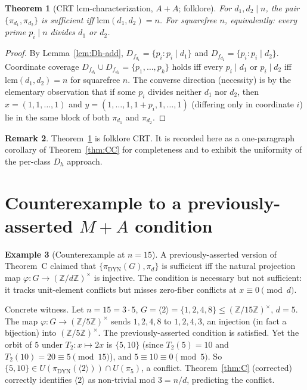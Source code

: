 \documentclass[11pt,reqno]{amsart}
\theoremstyle{plain}
\newtheorem{theorem}{Theorem}
\theoremstyle{definition}
\newtheorem{remark}[theorem]{Remark}
\newtheorem{example}[theorem]{Example}
\newcommand{\Z}{\mathbb{Z}}
\newcommand{\DYN}{\mathrm{DYN}}
\newcommand{\lcm}{\mathrm{lcm}}
\begin{document}
\begin{theorem}[CRT $\lcm$-characterization, $A{+}A$; folklore] \label{thm:D}
For $d_1, d_2 \mid n$, the pair $\{\pi_{d_1}, \pi_{d_2}\}$ is
sufficient iff $\lcm(d_1, d_2) = n$. For squarefree $n$,
equivalently: every prime $p_i \mid n$ divides $d_1$ or $d_2$.
\end{theorem}

\begin{proof}
By Lemma~\ref{lem:Dh-add}, $D_{f_{d_1}} = \{p_i : p_i \mid d_1\}$ and
$D_{f_{d_2}} = \{p_i : p_i \mid d_2\}$. Coordinate coverage
$D_{f_{d_1}} \cup D_{f_{d_2}} = \{p_1, \ldots, p_k\}$ holds iff every
$p_i \mid d_1$ or $p_i \mid d_2$ iff $\lcm(d_1, d_2) = n$ for
squarefree $n$. The converse direction (necessity) is by the
elementary observation that if some $p_i$ divides neither $d_1$ nor
$d_2$, then $x = (1, 1, \ldots, 1)$ and $y = (1, \ldots, 1, 1 + p_i, 1, \ldots, 1)$
(differing only in coordinate $i$) lie in the same block of both
$\pi_{d_1}$ and $\pi_{d_2}$.
\end{proof}

\begin{remark}
Theorem~\ref{thm:D} is folklore CRT. It is recorded here as a
one-paragraph corollary of Theorem~\ref{thm:CC} for completeness and
to exhibit the uniformity of the per-class $D_h$ approach.
\end{remark}

\section{Counterexample to a previously-asserted $M{+}A$ condition} \label{sec:n15}

\begin{example}[Counterexample at $n = 15$] \label{ex:n15}
A previously-asserted version of Theorem~C claimed that
$\{\pi_{\DYN}(G), \pi_d\}$ is sufficient iff the natural projection
map $\varphi : G \to (\Z/d\Z)^{\times}$ is injective. The condition
is necessary but not sufficient: it tracks unit-element conflicts but
misses zero-fiber conflicts at $x \equiv 0 \pmod d$.

Concrete witness. Let $n = 15 = 3 \cdot 5$,
$G = \langle 2 \rangle = \{1, 2, 4, 8\} \leq (\Z/15\Z)^{\times}$,
$d = 5$. The map $\varphi : G \to (\Z/5\Z)^{\times}$ sends
$1, 2, 4, 8$ to $1, 2, 4, 3$, an injection (in fact a bijection) into
$(\Z/5\Z)^{\times}$. The previously-asserted condition is satisfied.
Yet the orbit of $5$ under $T_2 : x \mapsto 2x$ is $\{5, 10\}$ (since
$T_2(5) = 10$ and $T_2(10) = 20 \equiv 5 \pmod{15}$), and
$5 \equiv 10 \equiv 0 \pmod 5$. So $\{5, 10\} \in U(\pi_{\DYN}(\langle 2 \rangle)) \cap U(\pi_5)$,
a conflict. Theorem~\ref{thm:C} (corrected) correctly identifies
$\langle 2 \rangle$ as non-trivial mod $3 = n/d$, predicting the
conflict.
\end{example}
\end{document}
